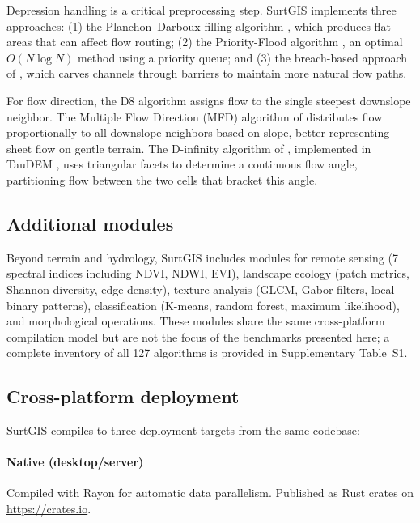 \documentclass[preprint,review,12pt,authoryear]{elsarticle}
\begin{document}
Depression handling is a critical preprocessing step. SurtGIS implements three approaches: (1) the Planchon--Darboux filling algorithm \citep{planchon2001}, which produces flat areas that can affect flow routing; (2) the Priority-Flood algorithm \citep{barnes2014}, an optimal $O(N \log N)$ method using a priority queue; and (3) the breach-based approach of \citet{lindsay2016}, which carves channels through barriers to maintain more natural flow paths.

For flow direction, the D8 algorithm \citep{ocallaghan1984} assigns flow to the single steepest downslope neighbor. The Multiple Flow Direction (MFD) algorithm of \citet{quinn1991} distributes flow proportionally to all downslope neighbors based on slope, better representing sheet flow on gentle terrain. The D-infinity algorithm of \citet{tarboton1997}, implemented in TauDEM \citep{tarboton2015taudem}, uses triangular facets to determine a continuous flow angle, partitioning flow between the two cells that bracket this angle.

\subsection{Additional modules}
\label{subsec:additional}

Beyond terrain and hydrology, SurtGIS includes modules for remote sensing (7 spectral indices including NDVI, NDWI, EVI), landscape ecology (patch metrics, Shannon diversity, edge density), texture analysis (GLCM, Gabor filters, local binary patterns), classification (K-means, random forest, maximum likelihood), and morphological operations. These modules share the same cross-platform compilation model but are not the focus of the benchmarks presented here; a complete inventory of all 127 algorithms is provided in Supplementary Table~S1.

\subsection{Cross-platform deployment}
\label{subsec:deployment}

SurtGIS compiles to three deployment targets from the same codebase:

\paragraph{Native (desktop/server)} Compiled with Rayon for automatic data parallelism. Published as Rust crates on \url{https://crates.io}.
\end{document}
